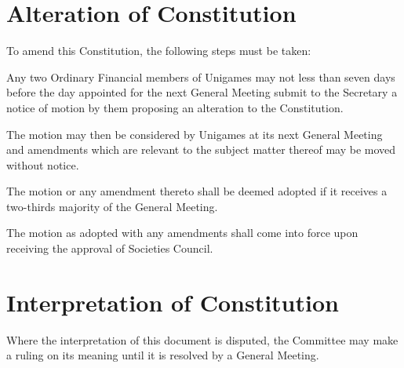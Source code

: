 \documentclass[a4paper]{article}
\begin{document}
\section{Alteration of Constitution} \label{sec:alteration}
\begin{myEnumerate}
    \item To amend this Constitution, the following steps must be taken:
        \begin{myEnumerate}
            \item Any two Ordinary Financial members of Unigames may not less than seven days before the day appointed for the next General Meeting submit to the Secretary a notice of motion by them proposing an alteration to the Constitution.
            \item The motion may then be considered by Unigames at its next General Meeting and amendments which are relevant to the subject matter thereof may be moved without notice.
            \item The motion or any amendment thereto shall be deemed adopted if it receives a two-thirds majority of the General Meeting.
            \item The motion as adopted with any amendments shall come into force upon receiving the approval of Societies Council.
        \end{myEnumerate}
\end{myEnumerate}


\section {Interpretation of Constitution} \label{sec:interpretation}
\begin{myEnumerate}
    \item Where the interpretation of this document is disputed, the Committee may make a ruling on its meaning until it is resolved by a General Meeting.
\end{myEnumerate}
\end{document}
